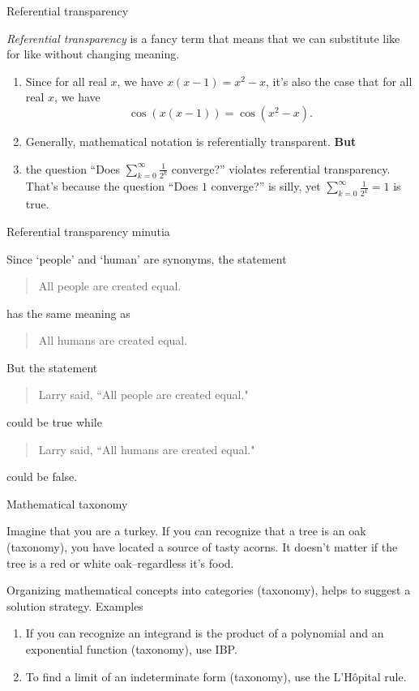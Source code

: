 \documentclass[portrait,fleqn,12pt]{beamer}
\newenvironment{handlist}
   {\begin{enumerate}[\faHandPointRight]
       \addtolength{\itemsep}{0.0\itemsep}}
     {\end{enumerate}}
\begin{document}
\begin{frame}{Referential transparency}

\emph{Referential transparency} is a fancy term that means that we can substitute like for like without changing meaning.  

\begin{handlist}
\item Since for all real $x$, we have $x (x-1) = x^2 -x$, it's also the case that for all real $x$, we have
$$
  \cos(x (x-1)) = \cos(x^2 - x).
$$

\item Generally, mathematical notation is referentially transparent.  \textbf{But}

\item the question ``Does $\sum_{k=0}^\infty \frac{1}{2^k}$ converge?'' violates referential transparency. That's because
the question ``Does  $1 $ converge?'' is silly, yet  $\sum_{k=0}^\infty \frac{1}{2^k} = 1$ is true.
\end{handlist}

\end{frame}

\begin{frame}{Referential transparency minutia}


  Since `people' and `human' are synonyms, the statement
  \begin{quote}
     All people are created equal.
  \end{quote}
has the same meaning as
\begin{quote}
  All humans are created equal.
\end{quote}
But the statement
\begin{quote}
  Larry said, ``All people are created equal."
\end{quote}
could be true while 
\begin{quote}
  Larry said, ``All humans are created equal."
\end{quote}
could be false.


  
\end{frame}

\begin{frame}{Mathematical taxonomy}


Imagine that you are a turkey. If you can recognize that a tree is an oak (taxonomy), 
you have located a source of tasty acorns. It doesn't matter if the tree is a red or white oak--regardless
it's food.

Organizing mathematical concepts into categories (taxonomy), helps to suggest a 
solution strategy.
 Examples
\begin{handlist}


\item If  you can recognize an integrand is the product of a polynomial and an 
exponential function (taxonomy), use IBP.
\item To find a limit of an indeterminate form  (taxonomy), use the L'Hôpital rule.

\end{handlist}
\end{frame}
\end{document}
